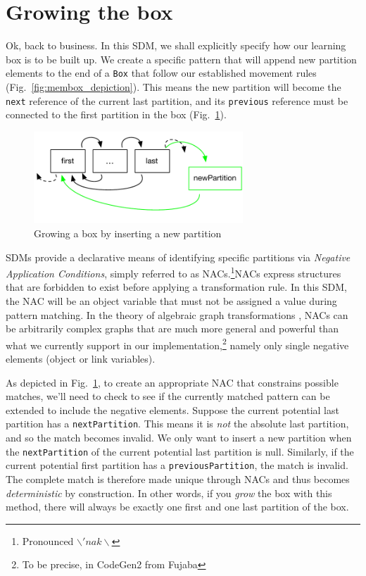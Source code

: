 \newpage
\section{Growing the box}
\genHeader

Ok, back to business. In this SDM, we shall explicitly specify how our learning box is to be built up. We create a specific pattern that will append new
partition elements to the end of a \texttt{Box} that follow our established movement rules (Fig.~\ref{fig:membox_depiction}). This means the new partition will
become the \texttt{next} reference of the current last partition, and its \texttt{previous} reference must be connected to the first partition in the box
(Fig.~\ref{fig:goal_grow}).

\begin{figure}[htbp]
 	\centering
  	\includegraphics[width=0.7\textwidth]{growBoxNACGoal.pdf}
	\caption{Growing a box by inserting a new partition}
	\label{fig:goal_grow}
\end{figure}
\FloatBarrier

SDMs provide a declarative means of identifying specific partitions via \emph{Negative Application Conditions}, simply referred to as
\mbox{NAC}s.\footnote{Pronounced $\backslash 'nak \backslash$}\mbox{NAC}s express structures that are forbidden to exist before applying a
transformation rule. In this SDM, the \mbox{NAC} will be an object variable that must not be assigned a value during pattern matching. In the theory of
algebraic graph transformations \cite{EEPT06}, \mbox{NACs} can be arbitrarily complex graphs that are much more general and powerful than what we currently
support in our implementation,\footnote{To be precise, in CodeGen2 from Fujaba} namely only single negative elements (object or link variables).

As depicted in Fig.~\ref{fig:goal_grow}, to create an appropriate \mbox{NAC} that constrains possible matches, we'll need to check to see if the currently
matched pattern can be extended to include the negative elements. Suppose the current potential last partition has a \texttt{nextPartition}. This means it
is \emph{not} the absolute last partition, and so the match becomes invalid. We only want to insert a new partition when the \texttt{nextPartition}
of the current potential last partition is null. Similarly, if the current potential first partition has a \texttt{previousPartition}, the match is invalid. The
complete match is therefore made unique through NACs and thus becomes \emph{deterministic} by construction. In other words, if you \emph{grow} the box with this method, there
will always be exactly one first and one last partition of the box.

